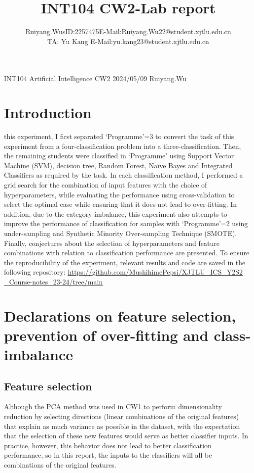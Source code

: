 \documentclass[journal]{IEEEtai}
\begin{document}
\title{INT104 CW2-Lab report} 


\author{Ruiyang.Wu\quad	sID:2257475\quad E-Mail:Ruiyang.Wu22@student.xjtlu.edu.cn
	\\
	TA: Yu Kang \quad E-Mail:yu.kang23@student.xjtlu.edu.cn
}

{INT104 Artificial Intelligence CW2 2024/05/09 Ruiyang.Wu}

\maketitle



\section{\textbf{Introduction}}

 this experiment, I first separated `Programme'=3 to convert the task of this experiment from a four-classification problem into a three-classification. Then, the remaining students were classified in `Programme' using Support Vector Machine (SVM), decision tree, Random Forest, Naïve Bayes and Integrated Classifiers as required by the task. In each classification method, I performed a grid search for the combination of input features with the choice of hyperparameters, while evaluating the performance using cross-validation to select the optimal case while ensuring that it does not lead to over-fitting. In addition, due to the category imbalance, this experiment also attempts to improve the performance of classification for samples with `Programme'=2 using under-sampling and Synthetic Minority Over-sampling Technique (SMOTE). Finally, conjectures about the selection of hyperparameters and feature combinations with relation to classification performance are presented. To ensure the reproducibility of the experiment, relevant results and code are saved in the following repository: 
\href{https://github.com/MushihimePepsi/XJTLU_ICS_Y2S2_Course-notes_23-24/tree/main}{\ul{https://github.com/MushihimePepsi/XJTLU\_ICS\_Y2S2\\\_Course-notes\_23-24/tree/main}}


\section{\textbf{Declarations on feature selection, prevention of over-fitting and class-imbalance}}
\subsection{\textbf{Feature selection}}
Although the PCA method was used in CW1 to perform dimensionality reduction by selecting directions (linear combinations of the original features) that explain as much variance as possible in the dataset, with the expectation that the selection of these new features would serve as better classifier inputs. In practice, however, this behavior does not lead to better classification performance, so in this report, the inputs to the classifiers will all be combinations of the original features.
\end{document}
